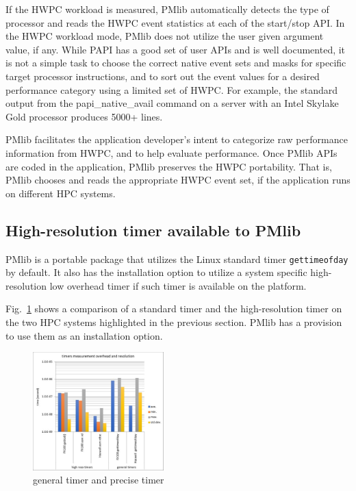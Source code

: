 \documentclass[conference]{IEEEtran}
\begin{document}
If the HWPC workload is measured,
PMlib automatically detects the type of processor and reads the HWPC
event statistics at each of the start/stop API.
In the HWPC workload mode, PMlib does not utilize the user given argument value,
if any.
While PAPI has a good set of user APIs and is well documented,
it is not a simple task to choose the correct native event sets and masks
for specific target processor instructions, and to sort out the event
values for a desired performance category using a limited set of HWPC.
For example,
the standard output from the papi\_native\_avail command on a server with
an Intel Skylake Gold processor produces 5000+ lines.

PMlib facilitates the application developer's intent to
categorize raw performance information from HWPC, and to
help evaluate performance.
Once PMlib APIs are coded in the application, PMlib preserves the HWPC
portability. That is, PMlib chooses and reads the appropriate HWPC event
set, if the application runs on different HPC systems.

\subsection{High-resolution timer available to PMlib}
PMlib is a portable package that utilizes the Linux standard timer
{\tt gettimeofday} by default. It also has the installation option to utilize
a system specific high-resolution low overhead timer if such timer is
available on the platform.

Fig.~\ref{fig:precise-timer} shows a comparison of a standard timer and
the high-resolution timer on the two HPC systems highlighted in the
previous section.
PMlib has a provision to use them as an installation option.

\begin{figure}[tb]
\centering
\includegraphics[width=0.45\textwidth]{figs/precise-timer.pdf}
\caption{general timer and precise timer}
\label{fig:precise-timer}
\end{figure}
\end{document}
